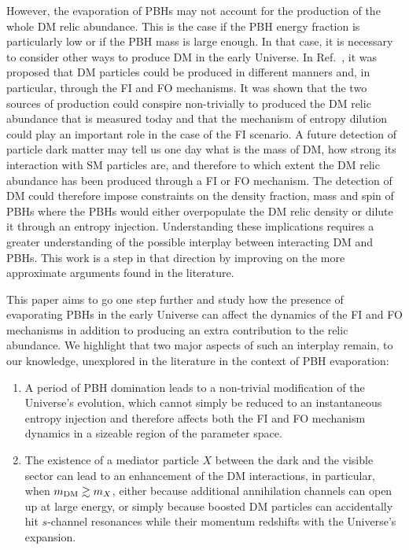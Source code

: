 \documentclass[aps,prd,reprint,twocolumn,preprintnumbers,floatfix,nofootinbib]{revtex4-1}
\begin{document}
However, the evaporation of PBHs may not account for the production of the whole DM relic abundance. This is the case if the PBH energy fraction is particularly low or if the PBH mass is large enough. In that case, it is necessary to consider other ways to produce DM in the early Universe. In Ref.~\cite{Gondolo:2020uqv, Bernal:2020bjf, Bernal:2020ili}, it was proposed that DM particles could be produced in different manners and, in particular, through the FI and FO mechanisms. It was shown that the two sources of production could conspire non-trivially to produced the DM relic abundance that is measured today and that the mechanism of entropy dilution could play an important role in the case of the FI scenario. 
{A future detection of particle dark matter may tell us one day what is the mass of DM, how strong its interaction with SM particles are, and therefore to which extent the DM relic abundance has been produced through a FI or FO mechanism. The detection of DM could therefore impose  constraints on the density fraction, mass and spin of PBHs where the PBHs  would either overpopulate the DM relic density or dilute it through an entropy injection.} Understanding these implications requires a greater understanding of the possible interplay between interacting DM and PBHs. This work is a step in that direction by improving on the more approximate arguments found in the literature. 

This paper aims to go one step further and study how the presence of evaporating PBHs in the early Universe can affect the dynamics of the FI and FO mechanisms in addition to producing an extra contribution to the relic abundance. We highlight that two major aspects of such an interplay remain, to our knowledge, unexplored in the literature in the context of PBH evaporation:
\begin{enumerate}
    \item A period of PBH domination leads to a non-trivial modification of the Universe's evolution, which cannot simply be reduced to an instantaneous entropy injection and therefore affects both the FI and FO mechanism dynamics in a sizeable region of the parameter space.
    
    \item The existence of a mediator particle $X$ between the dark and the visible sector can lead to an enhancement of the DM interactions, in particular, when $m_{\rm DM}\gtrsim m_X$, either because additional annihilation channels can open up at large energy, or simply because boosted DM particles can accidentally hit $s$-channel resonances while their momentum redshifts with the Universe's expansion.
\end{enumerate}
\end{document}
